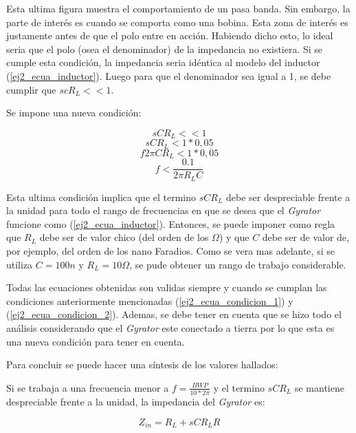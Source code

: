 \documentclass[12pt,a4paper]{article}
\begin{document}
Esta ultima figura muestra el comportamiento de un pasa banda. Sin embargo, la parte de interés es cuando se comporta como una bobina. Esta zona de interés es justamente antes de que el polo entre en acción. Habiendo dicho esto, lo ideal seria que el polo (osea el denominador)
de la impedancia no existiera. Si se cumple esta condición, la impedancia seria idéntica al modelo del inductor (\ref{ej2_ecua_inductor}). Luego para que el denominador sea igual a 1, se debe cumplir que $scR_L << 1 $. 

Se impone una nueva condición:

\begin{displaymath} sCR_L << 1 \end{displaymath}  
\begin{displaymath} sCR_L < 1 * 0,05 \end{displaymath}  
\begin{displaymath} f 2\pi CR_L < 1 * 0,05 \end{displaymath} 
\begin{equation} f < \frac{0.1}{2 \pi R_L C} \label{ej2_ecua_condicion_2} \end{equation}

Esta ultima condición implica que el termino $sCR_L$ debe ser despreciable frente a la unidad para todo el rango de frecuencias en que se desea que el \textit{Gyrator} funcione como (\ref{ej2_ecua_inductor}). Entonces, se puede imponer como regla que $R_L$ debe ser de valor chico (del orden de los $\Omega$) y que $C$ debe ser de valor de, por ejemplo, del orden de los nano Faradios. Como se vera mas adelante, si se utiliza $C = 100n$ y $R_L = 10\Omega$, se pude obtener un rango de trabajo considerable. 

Todas las ecuaciones obtenidas son validas siempre y cuando se cumplan las condiciones anteriormente mencionadas (\ref{ej2_ecua_condicion_1}) y (\ref{ej2_ecua_condicion_2}). Ademas, se debe tener en cuenta que se hizo todo el análisis considerando que el \textit{Gyrator} este conectado a tierra por lo que esta es una nueva condición para tener en cuenta. 

Para concluir se puede hacer una síntesis de los valores hallados:

Si se trabaja a una frecuencia menor a $f = \frac{BWP}{10 *2\pi}$ y el termino $sCR_L$ se mantiene despreciable frente a la unidad, la impedancia del \textit{Gyrator} es:

\begin{displaymath} Z_{in} = R_L + sC R_L R \end{displaymath}
\end{document}
